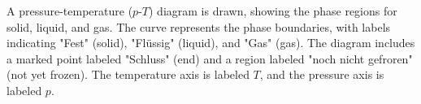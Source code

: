 A pressure-temperature (\( p \)-\( T \)) diagram is drawn, showing the phase regions for solid, liquid, and gas. The curve represents the phase boundaries, with labels indicating "Fest" (solid), "Flüssig" (liquid), and "Gas" (gas). The diagram includes a marked point labeled "Schluss" (end) and a region labeled "noch nicht gefroren" (not yet frozen). The temperature axis is labeled \( T \), and the pressure axis is labeled \( p \).